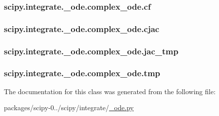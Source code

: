 \subsubsection[{cf}]{\setlength{\rightskip}{0pt plus 5cm}scipy.\+integrate.\+\_\+ode.\+complex\+\_\+ode.\+cf}\label{classscipy_1_1integrate_1_1__ode_1_1complex__ode_a3e5949a7d394007ba38855a8a5747919}
\hypertarget{classscipy_1_1integrate_1_1__ode_1_1complex__ode_a5afcac244dce0a8e521aef0ee869837a}{}
\subsubsection[{cjac}]{\setlength{\rightskip}{0pt plus 5cm}scipy.\+integrate.\+\_\+ode.\+complex\+\_\+ode.\+cjac}\label{classscipy_1_1integrate_1_1__ode_1_1complex__ode_a5afcac244dce0a8e521aef0ee869837a}
\hypertarget{classscipy_1_1integrate_1_1__ode_1_1complex__ode_a8b1c8eabea1303868f0869f532a9a8f7}{}
\subsubsection[{jac\+\_\+tmp}]{\setlength{\rightskip}{0pt plus 5cm}scipy.\+integrate.\+\_\+ode.\+complex\+\_\+ode.\+jac\+\_\+tmp}\label{classscipy_1_1integrate_1_1__ode_1_1complex__ode_a8b1c8eabea1303868f0869f532a9a8f7}
\hypertarget{classscipy_1_1integrate_1_1__ode_1_1complex__ode_a50077638244fd7cc33ffadaf3c1f05f5}{}
\subsubsection[{tmp}]{\setlength{\rightskip}{0pt plus 5cm}scipy.\+integrate.\+\_\+ode.\+complex\+\_\+ode.\+tmp}\label{classscipy_1_1integrate_1_1__ode_1_1complex__ode_a50077638244fd7cc33ffadaf3c1f05f5}


The documentation for this class was generated from the following file\+:\begin{DoxyCompactItemize}
\item 
packages/scipy-\/0../scipy/integrate/\hyperlink{__ode_8py}{\+\_\+ode.\+py}\end{DoxyCompactItemize}
